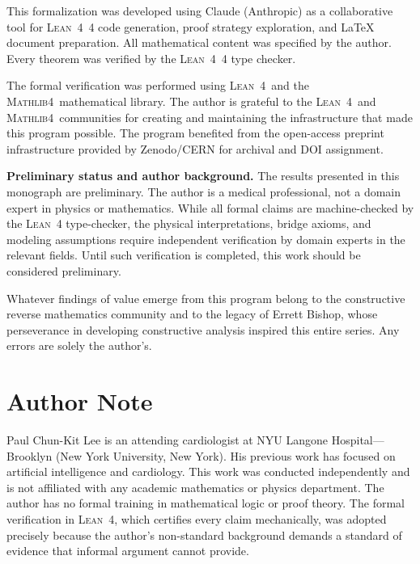 \documentclass[11pt,a4paper]{report}
\theoremstyle{plain}
\theoremstyle{definition}
\theoremstyle{remark}
\newcommand{\Lean}{\textsc{Lean~4}}
\newcommand{\Mathlib}{\textsc{Mathlib4}}
\begin{document}
This formalization was developed using Claude (Anthropic) as a
collaborative tool for \Lean{}~4 code generation, proof strategy
exploration, and \LaTeX{} document preparation.  All mathematical
content was specified by the author.  Every theorem was verified
by the \Lean{}~4 type checker.

The formal verification was performed using \Lean\ and the \Mathlib\ mathematical library. The author is grateful to the \Lean\ and \Mathlib\ communities for creating and maintaining the infrastructure that made this program possible. The program benefited from the open-access preprint infrastructure provided by Zenodo/CERN for archival and DOI assignment.

\medskip\noindent
\textbf{Preliminary status and author background.}
The results presented in this monograph are preliminary.  The author is a medical
professional, not a domain expert in physics or mathematics.  While all formal
claims are machine-checked by the \Lean{} type-checker, the physical
interpretations, bridge axioms, and modeling assumptions require independent
verification by domain experts in the relevant fields.  Until such verification
is completed, this work should be considered preliminary.

\medskip\noindent
Whatever findings of value emerge from this program belong to the
constructive reverse mathematics community and to the legacy of Errett Bishop,
whose perseverance in developing constructive analysis inspired this entire
series.  Any errors are solely the author's.

\chapter*{Author Note}

Paul Chun-Kit Lee is an attending cardiologist at NYU Langone Hospital---Brooklyn (New York University, New York). His previous work has focused on artificial intelligence and cardiology. This work was conducted independently and is not affiliated with any academic mathematics or physics department. The author has no formal training in mathematical logic or proof theory. The formal verification in \Lean, which certifies every claim mechanically, was adopted precisely because the author's non-standard background demands a standard of evidence that informal argument cannot provide.
\end{document}
